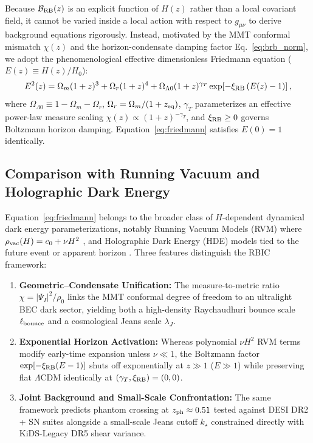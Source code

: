 \documentclass[preprint,12pt]{elsarticle}
\begin{document}
Because $\mathcal{B}_{\rm RB}(z)$ is an explicit function of $H(z)$ rather than a local covariant field, it cannot be varied inside a local action with respect to $g_{\mu\nu}$ to derive background equations rigorously. Instead, motivated by the MMT conformal mismatch $\chi(z)$ and the horizon-condensate damping factor Eq.~\eqref{eq:brb_norm}, we adopt the phenomenological effective dimensionless Friedmann equation ($E(z) \equiv H(z)/H_0$):
\begin{equation}
    E^2(z) = \Omega_m (1+z)^3 + \Omega_r (1+z)^4 + \Omega_{\Lambda 0} (1+z)^{\gamma_T} \exp\!\left[-\xi_{\rm RB}\left(E(z) - 1\right)\right],
    \label{eq:friedmann}
\end{equation}
where $\Omega_{\Lambda 0} \equiv 1 - \Omega_m - \Omega_r$, $\Omega_r = \Omega_m/(1+z_{\rm eq})$, $\gamma_T$ parameterizes an effective power-law measure scaling $\chi(z) \propto (1+z)^{-\gamma_T}$, and $\xi_{\rm RB} \ge 0$ governs Boltzmann horizon damping. Equation~\eqref{eq:friedmann} satisfies $E(0) = 1$ identically.

\subsection*{Comparison with Running Vacuum and Holographic Dark Energy}
Equation~\eqref{eq:friedmann} belongs to the broader class of $H$-dependent dynamical dark energy parameterizations, notably Running Vacuum Models (RVM) where $\rho_{\rm vac}(H) = c_0 + \nu H^2$ \cite{Sola2018}, and Holographic Dark Energy (HDE) models tied to the future event or apparent horizon \cite{Li2004, Wang2017}. Three features distinguish the RBIC framework:
\begin{enumerate}
    \item \textbf{Geometric--Condensate Unification:} The measure-to-metric ratio $\chi = |\Psi_I|^2/\rho_0$ links the MMT conformal degree of freedom to an ultralight BEC dark sector, yielding both a high-density Raychaudhuri bounce scale $\ell_{\rm bounce}$ and a cosmological Jeans scale $\lambda_J$.
    \item \textbf{Exponential Horizon Activation:} Whereas polynomial $\nu H^2$ RVM terms modify early-time expansion unless $\nu \ll 1$, the Boltzmann factor $\exp[-\xi_{\rm RB}(E-1)]$ shuts off exponentially at $z \gg 1$ ($E \gg 1$) while preserving flat $\Lambda$CDM identically at $(\gamma_T, \xi_{\rm RB}) = (0,0)$.
    \item \textbf{Joint Background and Small-Scale Confrontation:} The same framework predicts phantom crossing at $z_{\rm ph} \approx 0.51$ tested against DESI DR2 + SN suites alongside a small-scale Jeans cutoff $k_\star$ constrained directly with KiDS-Legacy DR5 shear variance.
\end{enumerate}
\end{document}
